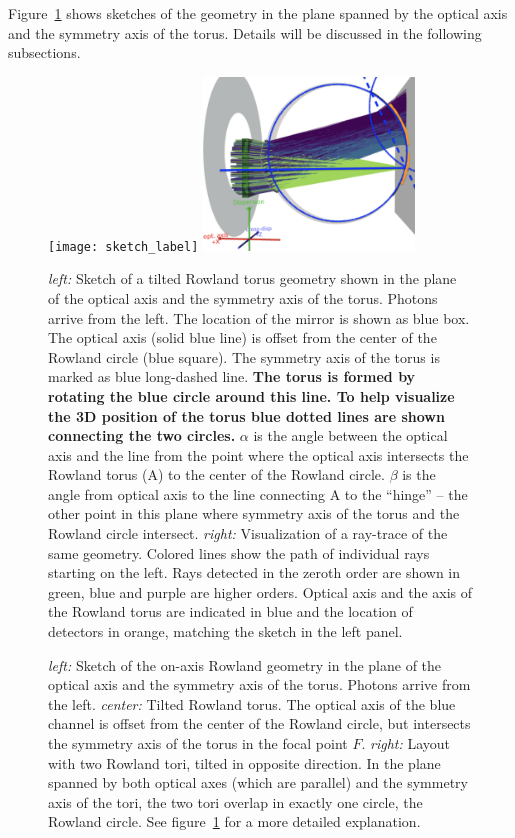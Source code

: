 \documentclass[linenumbers]{aastex631}
\begin{document}
Figure~\ref{fig:sketch_label} shows sketches of the geometry in the plane spanned by the optical axis and the symmetry axis of the torus. Details will be discussed in the following subsections.
\begin{figure}
    \texttt{[image: sketch\_label]}
    \includegraphics[width=0.5\textwidth]{raytrace_labelled}
    \caption{\emph{left:} Sketch of a tilted Rowland torus geometry shown in the plane of the optical axis and the symmetry axis of the torus. Photons arrive from the left. The location of the mirror is shown as blue box. The optical axis (solid blue line) is offset from the center of the Rowland circle (blue square). The symmetry axis of the torus  is marked as blue long-dashed line. \textbf{The torus is formed by rotating the blue circle around this line. To help visualize the 3D position of the torus blue dotted lines are shown connecting the two circles.} $\alpha$ is the angle between the optical axis and the line from the point where the optical axis intersects the Rowland torus (A) to the center of the Rowland circle. $\beta$ is the angle from optical axis to the line connecting A to the ``hinge'' -- the other point in this plane where symmetry axis of the torus and the Rowland circle intersect.
    \emph{right:} Visualization of a ray-trace of the same geometry. Colored lines show the path of individual rays starting on the left. Rays detected in the zeroth order are shown in green, blue and purple are higher orders. Optical axis and the axis of the Rowland torus are indicated in blue and the location of detectors in orange, matching the sketch in the left panel.
        }
    \label{fig:sketch_label}
\end{figure}
\begin{figure}
    \caption{\emph{left:} Sketch of the on-axis Rowland geometry in the plane of the optical axis and the symmetry axis of the torus. Photons arrive from the left.
    \emph{center:} Tilted Rowland torus. The optical axis of the blue channel is offset from the center of the Rowland circle, but intersects the symmetry axis of the torus in the focal point $F$.
    \emph{right:} Layout with two Rowland tori, tilted in opposite direction. In the plane spanned by both optical axes (which are parallel) and the symmetry axis of the tori, the two tori overlap in exactly one circle, the Rowland circle. See figure~\ref{fig:sketch_label} for a more detailed explanation.
        }
    \label{fig:sketch}
\end{figure}
\end{document}
